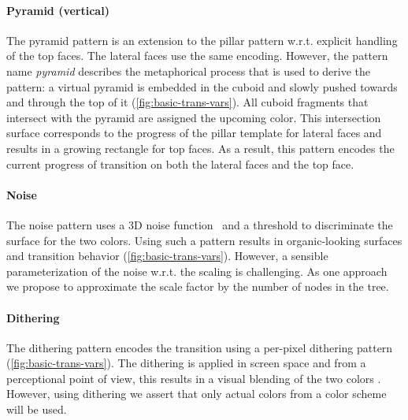 \documentclass[sigconf%
,natbib=true%
]{acmart}
\begin{document}
\paragraph{Pyramid (vertical)}
The pyramid pattern is an extension to the pillar pattern w.r.t. explicit handling of the top faces.
The lateral faces use the same encoding.
However, the pattern name \emph{pyramid} describes the metaphorical process that is used to derive the pattern: a virtual pyramid is embedded in the cuboid and slowly pushed towards and through the top of it (\autoref{fig:basic-trans-vars}).
All cuboid fragments that intersect with the pyramid are assigned the upcoming color.
This intersection surface corresponds to the progress of the pillar template for lateral faces and results in a growing rectangle for top faces.
As a result, this pattern encodes the current progress of transition on both the lateral faces and the top face.

\paragraph{Noise}
The noise pattern uses a 3D noise function~\cite{Perlin01} and a threshold to discriminate the surface for the two colors.
Using such a pattern results in organic-looking surfaces and transition behavior (\autoref{fig:basic-trans-vars}).
However, a sensible parameterization of the noise w.r.t. the scaling is challenging.
As one approach we propose to approximate the scale factor by the number of nodes in the tree.

\paragraph{Dithering}
The dithering pattern encodes the transition using a per-pixel dithering pattern (\autoref{fig:basic-trans-vars}).
The dithering is applied in screen space and from a perceptional point of view, this results in a visual blending of the two colors \cite{Ulichney88}.
However, using dithering we assert that only actual colors from a color scheme will be used.
\end{document}
